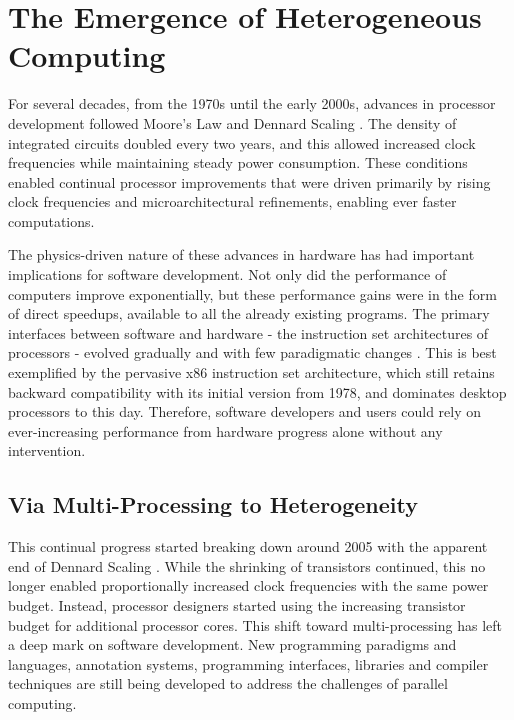 \section{The Emergence of Heterogeneous Computing}

    For several decades, from the 1970s until the early 2000s, advances in
    processor development followed Moore's Law \citep{4785860} and
    Dennard Scaling \citep{1050511}.
    The density of integrated circuits doubled every two years,
    and this allowed increased clock frequencies while maintaining
    steady power consumption.
    These conditions enabled continual processor improvements that were driven
    primarily by rising clock frequencies and microarchitectural refinements,
    enabling ever faster computations.

    The physics-driven nature \citep{Hutcheson2018Moore} of these advances in
    hardware has had important implications for software development.
    Not only did the performance of computers improve exponentially, but these
    performance gains were in the form of direct speedups, available to all the
    already existing programs.
    The primary interfaces between software and hardware - the instruction set
    architectures of processors - evolved gradually and with few
    paradigmatic changes \citep{8310168}.
    This is best exemplified by the pervasive x86 instruction set architecture,
    which still retains backward compatibility with its initial version from
    1978, and dominates desktop processors to this day.
    Therefore, software developers and users could rely on ever-increasing
    performance from hardware progress alone without any intervention.

\subsection{Via Multi-Processing to Heterogeneity}

    This continual progress started breaking down around 2005 with the apparent
    end of Dennard Scaling \citep{6307773}.
    While the shrinking of transistors continued, this no longer enabled
    proportionally increased clock frequencies with the same power budget.
    Instead, processor designers started using the increasing transistor
    budget for additional processor cores.
    This shift toward multi-processing has left a deep mark on software
    development.
    New programming paradigms and languages, annotation systems, programming
    interfaces, libraries and compiler techniques are still being developed to
    address the challenges of parallel computing.

